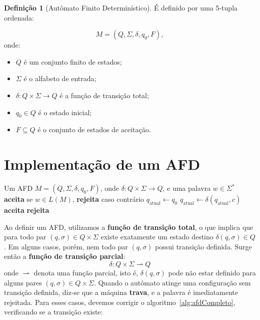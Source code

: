 \documentclass[12pt, a4paper]{article}
\theoremstyle{definition}
\newtheorem{definition}{Definição}[section]
\theoremstyle{plain}
\theoremstyle{remark}
\begin{document}
\begin{definition}[Autômato Finito Determinístico]
É definido por uma 5-tupla ordenada:

\[
M = (Q, \Sigma, \delta, q_0, F),
\]
onde:

\begin{itemize}
    \item $Q$ é um conjunto finito de estados;
    \item $\Sigma$ é o alfabeto de entrada;
    \item $\delta : Q \times \Sigma \to Q$ é a função de transição total;
    \item $q_0 \in Q$ é o estado inicial;
    \item $F \subseteq Q$ é o conjunto de estados de aceitação.
\end{itemize}

\end{definition}

\section{Implementação de um AFD}

\begin{algorithm}[H]
  \caption{Simulação de um AFD com $\delta(\cdot, \cdot)$ completa}
  \label{alg:afdCompleto}
  \begin{algorithmic}[1]
    \Require Um AFD $M = (Q, \Sigma, \delta, q_0, F)$,
             onde $\delta : Q \times \Sigma \to Q$,
             e uma palavra $w \in \Sigma^*$
    \Ensure  \textbf{aceita} se $w \in L(M)$, \textbf{rejeita} caso contrário
    \State $q_{\text{atual}} \gets q_0$
      \State $q_{\text{atual}} \gets \delta(q_{\text{atual}}, c)$
    \EndFor
      \State \Return \textbf{aceita}
    \Else
      \State \Return \textbf{rejeita}
    \EndIf
  \end{algorithmic}
\end{algorithm}

Ao definir um AFD, utilizamos a \textbf{função de transição total}, o que implica que para todo par $(q, \sigma) \in Q \times \Sigma$ existe exatamente um estado destino $\delta(q, \sigma) \in Q$. Em alguns casos, porém, nem todo par $(q, \sigma)$ possui transição definida. Surge então a \textbf{função de transição parcial}:
\[
    \delta : Q \times \Sigma \rightharpoonup Q
\]
onde $\rightharpoonup$ denota uma função parcial, isto é, $\delta(q, \sigma)$ pode não estar definido para alguns pares $(q, \sigma) \in Q \times \Sigma$. Quando o autômato atinge uma configuração sem transição definida, diz-se que a máquina \textbf{trava}, e a palavra é imediatamente rejeitada. Para esses casos, devemos corrigir o algoritmo~\ref{alg:afdCompleto}, verificando se a transição existe:
\end{document}
